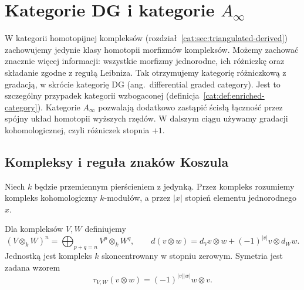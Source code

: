 \section{\texorpdfstring{Kategorie DG i kategorie $A_\infty$}{Kategorie DG i kategorie A-infty}}\label{cat:sec:dg-a-infty}

W kategorii homotopijnej kompleksów (rozdział~\ref{cat:sec:triangulated-derived}) zachowujemy jedynie klasy homotopii morfizmów kompleksów. Możemy zachować znacznie więcej informacji: wszystkie morfizmy jednorodne, ich różniczkę oraz składanie zgodne z regułą Leibniza. Tak otrzymujemy kategorię różniczkową z gradacją, w skrócie kategorię DG (ang.\ differential graded category). Jest to szczególny przypadek kategorii wzbogaconej (definicja~\ref{cat:def:enriched-category}). Kategorie $A_\infty$ pozwalają dodatkowo zastąpić ścisłą łączność przez spójny układ homotopii wyższych rzędów. W dalszym ciągu używamy gradacji kohomologicznej, czyli różniczek stopnia $+1$.

\subsection{Kompleksy i reguła znaków Koszula}

Niech $k$ będzie przemiennym pierścieniem z jedynką. Przez kompleks rozumiemy kompleks kohomologiczny $k$-modułów, a przez $|x|$ stopień elementu jednorodnego $x$.

\begin{definicja}\label{cat:def:dg-tensor-complex}
Dla kompleksów $V,W$ definiujemy
\[
 (V\otimes_k W)^n=\bigoplus_{p+q=n}V^p\otimes_k W^q,
 \qquad
 d(v\otimes w)=d_Vv\otimes w+(-1)^{|v|}v\otimes d_Ww.
\]
Jednostką jest kompleks $k$ skoncentrowany w stopniu zerowym. Symetria jest zadana wzorem
\[
 \tau_{V,W}(v\otimes w)=(-1)^{|v||w|}w\otimes v.
\]
\end{definicja}

